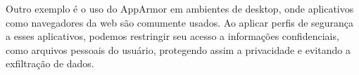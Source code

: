 Outro exemplo é o uso do AppArmor em ambientes de desktop, onde aplicativos como navegadores da web são comumente usados. Ao aplicar perfis de segurança a esses aplicativos, podemos restringir seu acesso a informações confidenciais, como arquivos pessoais do usuário, protegendo assim a privacidade e evitando a exfiltração de dados.